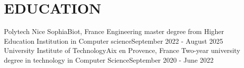 \section{\color{airforceblue}EDUCATION}
\resumeSubHeadingListStart
\resumeSubheading
{Polytech Nice Sophia}{Biot, France}
{Engineering master degree from Higher Education Institution in Computer science}{September 2022 - August 2025}
\resumeSubheading
{University Institute of Technology}{Aix en Provence, France}
{Two-year university degree in technology in Computer Science}{September 2020 - June 2022}
\resumeSubHeadingListEnd
\vspace{-10pt}
